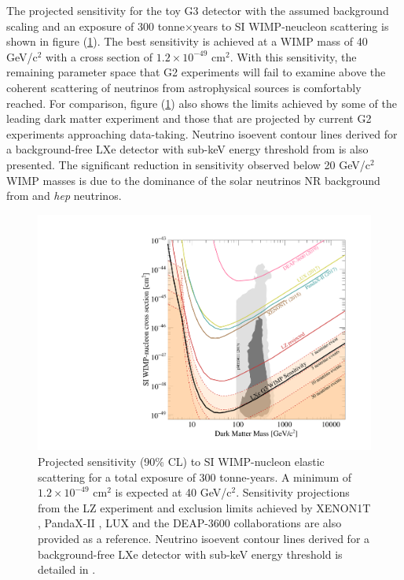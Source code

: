 The projected sensitivity for the toy G3 detector with the assumed background scaling and an exposure of 300 tonne$\times$years to SI WIMP-neucleon scattering is shown in figure (\ref{Fig:si_wimp_sensitivity}). The best sensitivity is achieved at a WIMP mass of 40 GeV/c$^{2}$ with a cross section of $1.2 \times 10^{-49}$ cm$^{2}$. With this sensitivity, the remaining parameter space that G2 experiments will fail to examine above the coherent scattering of neutrinos from astrophysical sources is comfortably reached. For comparison, figure (\ref{Fig:si_wimp_sensitivity}) also shows the limits achieved by some of the leading dark matter experiment and those that are projected by current G2 experiments approaching data-taking. Neutrino isoevent contour lines derived for a background-free LXe detector with sub-keV energy threshold from \cite{Billard_2014} is also presented. The significant reduction in sensitivity observed below 20 GeV/c$^{2}$ WIMP masses is due to the dominance of the solar neutrinos NR background from \BE{} and \textit{hep} neutrinos. 


\begin{figure}[h!]
    \centerline{\includegraphics[width=\linewidth]{Chapter_6/Figures/g3dm_si_vs_mass.pdf}}
    \caption{Projected sensitivity (90\% CL) to SI WIMP-nucleon elastic scattering for a total exposure of 300 tonne-years. A minimum of $1.2 \times 10^{-49}$ cm$^{2}$ is expected at 40 GeV/c$^{2}$. Sensitivity projections from the LZ experiment \cite{lz} and exclusion limits achieved by XENON1T \cite{Dark Matter Search Results from a One Ton}, PandaX-II \cite{pandax_limit}, LUX \cite{Akerib:2017kat} and the DEAP-3600 \cite{DEAP_3600} collaborations are also provided as a reference. Neutrino isoevent contour lines derived for a background-free LXe detector with sub-keV energy threshold is detailed in \cite{neutrino_floor}.}
    \label{Fig:si_wimp_sensitivity}
\end{figure}

\newpage